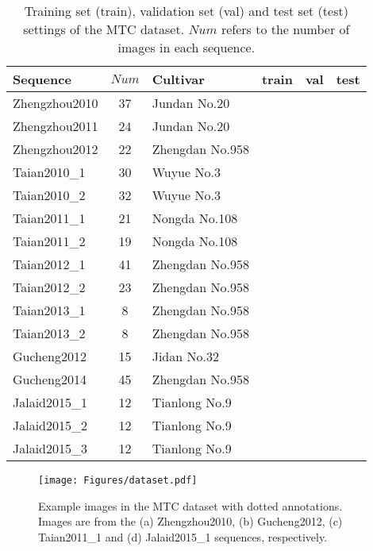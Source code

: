\documentclass[twocolumn]{bmcart}%
\begin{document}
\begin{table}[!t]
	\centering
	\caption{Training set (train), validation set (val) and test set (test) settings of the MTC dataset. $Num$ refers to the number of images in each sequence.}
	\label{tab:dataset}
	\renewcommand\arraystretch{1.25}
	\addtolength{\tabcolsep}{-1pt}
	\begin{tabular}{l|clccc}
		\hline
		Sequence & $Num$ & Cultivar & train & val & test\\
		\hline
		Zhengzhou2010 & 37 & Jundan No.20    & \checkmark & \checkmark & \\
		Zhengzhou2011 & 24 & Jundan No.20    &            &            & \checkmark\\
		Zhengzhou2012 & 22 & Zhengdan No.958 & \checkmark & \checkmark & \\
		Taian2010\_1  & 30 & Wuyue No.3      & \checkmark & \checkmark & \\
		Taian2010\_2  & 32 & Wuyue No.3      &            &            & \checkmark\\
		Taian2011\_1  & 21 & Nongda No.108   & \checkmark & \checkmark & \\
		Taian2011\_2  & 19 & Nongda No.108   &            &            & \checkmark\\
		Taian2012\_1  & 41 & Zhengdan No.958 & \checkmark & \checkmark & \\
		Taian2012\_2  & 23 & Zhengdan No.958 &            &            & \checkmark\\
		Taian2013\_1  & 8  & Zhengdan No.958 & \checkmark & \checkmark & \\
		Taian2013\_2  & 8  & Zhengdan No.958 &            &            & \checkmark\\
		Gucheng2012   & 15 & Jidan No.32     & \checkmark & \checkmark & \\
		Gucheng2014   & 45 & Zhengdan No.958 &            &            & \checkmark\\
		Jalaid2015\_1 & 12 & Tianlong No.9   & \checkmark & \checkmark & \\
		Jalaid2015\_2 & 12 & Tianlong No.9   &            &            & \checkmark\\
		Jalaid2015\_3 & 12 & Tianlong No.9   &            &            & \checkmark\\
		\hline
	\end{tabular}
\end{table}

\begin{figure*}[h!]
	\centering
	\texttt{[image: Figures/dataset.pdf]}
	\caption{Example images in the MTC dataset with dotted annotations. Images are from the (a) Zhengzhou2010, (b) Gucheng2012, (c) Taian2011\_1 and (d) Jalaid2015\_1 sequences, respectively.}
	\label{fig:dataset}
\end{figure*}
\end{document}
